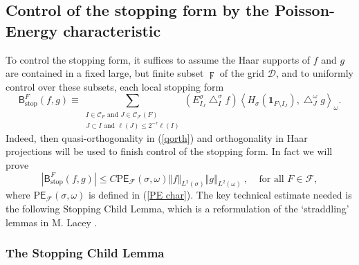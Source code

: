 \documentclass{amsart}%
\theoremstyle{plain}
\numberwithin{equation}{section}
\begin{document}
\subsection{Control of the stopping form by the Poisson-Energy characteristic}

To control the stopping form, it suffices to assume the Haar supports of $f$
and $g$ are contained in a fixed large, but finite subset $\digamma$ of the
grid $\mathcal{D}$, and to uniformly control over these subsets, each local
stopping form%
\[
\mathsf{B}_{\operatorname*{stop}}^{F}\left(  f,g\right)  \equiv\sum
_{\substack{I\in\mathcal{C}_{F}\text{ and }J\in\mathcal{C}_{\mathcal{F}%
}\left(  F\right)  \\J\subset I\text{ and }\ell\left(  J\right)  \leq2^{-\tau
}\ell\left(  I\right)  }}\left(  E_{I_{J}}^{\sigma}\bigtriangleup_{I}^{\sigma
}f\right)  \left\langle H_{\sigma}\left(  \mathbf{1}_{F\setminus I_{J}%
}\right)  ,\bigtriangleup_{J}^{\omega}g\right\rangle _{\omega}.
\]
Indeed, then quasi-orthogonality in (\ref{qorth}) and orthogonality in Haar
projections will be used to finish control of the stopping form. In fact we
will prove%
\begin{equation}
\left\vert \mathsf{B}_{\operatorname*{stop}}^{F}\left(  f,g\right)
\right\vert \leq C\mathrm{P}\mathsf{E}_{\mathcal{F}}\left(  \sigma
,\omega\right)  \left\Vert f\right\Vert _{L^{2}(\sigma)}\left\Vert
g\right\Vert _{L^{2}(\omega)}\ ,\ \ \ \ \ \text{for all }F\in\mathcal{F}%
,\label{stop est}%
\end{equation}
where $\mathrm{P}\mathsf{E}_{\mathcal{F}}\left(  \sigma,\omega\right)  $ is
defined in (\ref{PE char}). The key technical estimate needed is the following
Stopping Child Lemma, which is a reformulation of the `straddling' lemmas in
M. Lacey \cite[Lemmas 3.19 and 3.16]{Lac}.

\subsubsection{The Stopping Child Lemma}
\end{document}
